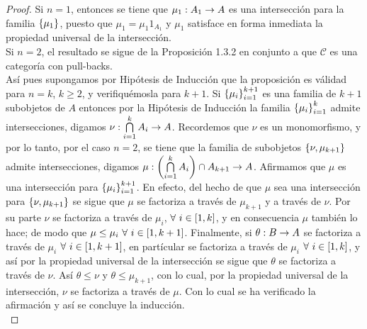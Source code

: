 \documentclass{article}
\begin{document}
\begin{enumerate}[label=\textbf{Ej \arabic*.}]
\begin{proof}
			Si $n=1$, entonces se tiene que $\catarrow{\mu_1}{A_1}{A}{}$ es una intersección para la familia $\left\{\mu_1\right\}$, puesto que 
			$\mu_1=\mu_1 1_{A_1}$ y $\mu_1$ satisface en forma inmediata la propiedad universal de la intersección.\\
			Si $n=2$, el resultado se sigue de la Proposición 1.3.2 en conjunto a que $\mathscr{C}$ es una categoría con pull-backs.\\
			Así pues supongamos por Hipótesis de Inducción que la proposición es válidad para $n=k$, $k\geq 2$, y verifiquémosla para $k+1$.
			Si ${\left\{{\mu}_{i}\right\}}_{i=1}^{k+1}$ es una familia de $k+1$ subobjetos de $A$ entonces por la Hipótesis de Inducción la familia ${\left\{{\mu}_{i}\right\}}_{i=1}^{k}$  admite intersecciones, digamos $\catarrow{\nu}{\bigcap\limits_{i=1}^{k}A_i}{A}{}$. Recordemos que $\nu$ es un monomorfismo, y por lo tanto, por el caso $n=2$, se tiene que la familia de subobjetos $\left\{\nu,\mu_{k+1}\right\}$ admite intersecciones, digamos $\catarrow{\mu}{\lrprth{\bigcap\limits_{i=1}^{k}A_i}\cap A_{k+1}}{A}{}$. Afirmamos que $\mu$ es una intersección para ${\left\{{\mu}_{i}\right\}}_{i=1}^{k+1}$. En efecto, del hecho de que $\mu$ sea una intersección para $\left\{\nu,\mu_{k+1}\right\}$ se sigue que $\mu$ se factoriza a través de $\mu_{k+1}$ y a través de $\nu$. Por su parte $\nu$ se factoriza a través de $\mu_i$, $\forall\ i\in\left[1,k\right]$, y en consecuencia $\mu$ también lo hace; de modo que $\mu\leq\mu_i\ \forall\ i\in\lrsqp{1,k+1}$. Finalmente, si $\catarrow{\theta}{B}{A}{}$ se factoriza a través de $\mu_i$ $\forall\ i\in\left[1,k+1\right]$, en partícular se factoriza a través de $\mu_i$ $\forall\ i\in\left[1,k\right]$, y así por la propiedad universal de la intersección se sigue que $\theta$ se factoriza a través de $\nu$. Así $\theta\leq \nu$ y $\theta\leq \mu_{k+1}$, con lo cual, por la propiedad universal de la intersección, $\nu$ se factoriza a través de $\mu$. Con lo cual se ha verificado la afirmación y así se concluye la inducción.\\
		\end{proof}
	\end{enumerate}	
\end{document}
